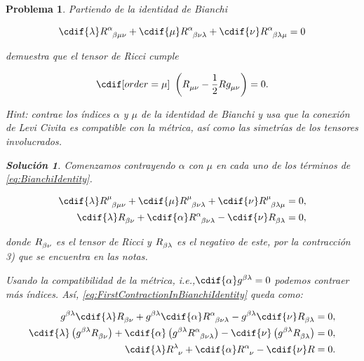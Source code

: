 \documentclass[12pt]{article}
\theoremstyle{break}
\newtheorem{exercise}{Problema}
\theoremstyle{nonumberbreak}
\newtheorem{solution}{Solución}
\newcommand{\idest}{\emph{i.e.},\xspace} %
\begin{document}
    \pagebreak
    \begin{exercise}
      Partiendo de la identidad de Bianchi

      \begin{equation}
        \cdif{\lambda}\tensor{R}{^{\alpha}_{\beta\mu\nu}} 
        + \cdif{\mu}\tensor{R}{^{\alpha}_{\beta\nu\lambda}}
        + \cdif{\nu}\tensor{R}{^{\alpha}_{\beta\lambda\mu}}
        = 0
        \label{eq:BianchiIdentity}
      \end{equation}

      demuestra que el tensor de Ricci cumple

      \begin{equation*}
        \cdif[order={\mu}]{\phantom{i}}\left(\tensor{R}{_{\mu\nu}} - \dfrac{1}{2}R\tensor{g}{_{\mu\nu}}\right) = 0.
      \end{equation*}

      \emph{Hint:} contrae los índices \(\alpha\) y \(\mu\) de la identidad de Bianchi y usa que la conexión de Levi Civita es compatible con la métrica, así como las simetrías de los tensores involucrados.

      \begin{solution}
        Comenzamos contrayendo \(\alpha\) con \(\mu\) en cada uno de los términos de \cref{eq:BianchiIdentity}.

        \begin{align}
          \cdif{\lambda}\tensor{R}{^{\mu}_{\beta\mu\nu}} + \cdif{\mu}\tensor{R}{^{\mu}_{\beta\nu\lambda}} + \cdif{\nu}\tensor{R}{^{\mu}_{\beta\lambda\mu}} &= 0,\nonumber\\
          \cdif{\lambda}\tensor{R}{_{\beta\nu}} + \cdif{\alpha}\tensor{R}{^{\alpha}_{\beta\nu\lambda}} - \cdif{\nu}\tensor{R}{_{\beta\lambda}} &= 0,\label{eq:FirstContractionInBianchiIdentity}
        \end{align}

        donde \(\tensor{R}{_{\beta\nu}}\) es el tensor de Ricci y \(\tensor{R}{_{\beta\lambda}}\) es el negativo de este, por la contracción 3) que se encuentra en las notas.

        Usando la compatibilidad de la métrica, \idest \(\cdif{\alpha} \tensor{g}{^{\beta\lambda}} = 0\) podemos contraer más índices. Así, \cref{eq:FirstContractionInBianchiIdentity} queda como:

        \begin{align}
          \tensor{g}{^{\beta\lambda}}\cdif{\lambda}\tensor{R}{_{\beta\nu}} + \tensor{g}{^{\beta\lambda}}\cdif{\alpha}\tensor{R}{^{\alpha}_{\beta\nu\lambda}} - \tensor{g}{^{\beta\lambda}}\cdif{\nu}\tensor{R}{_{\beta\lambda}} &= 0,\nonumber\\
          \cdif{\lambda}\left(\tensor{g}{^{\beta\lambda}}\tensor{R}{_{\beta\nu}}\right) + \cdif{\alpha}\left(\tensor{g}{^{\beta\lambda}}\tensor{R}{^{\alpha}_{\beta\nu\lambda}}\right) - \cdif{\nu}\left(\tensor{g}{^{\beta\lambda}}\tensor{R}{_{\beta\lambda}}\right) &= 0,\nonumber\\
          \cdif{\lambda}\tensor{R}{^{\lambda}_{\nu}} + \cdif{\alpha}\tensor{R}{^{\alpha}_{\nu}} - \cdif{\nu}R &= 0.\label{eq:SecondContractionInBianchiIdentity} 
        \end{align}


\end{solution}
\end{exercise}
\end{document}
